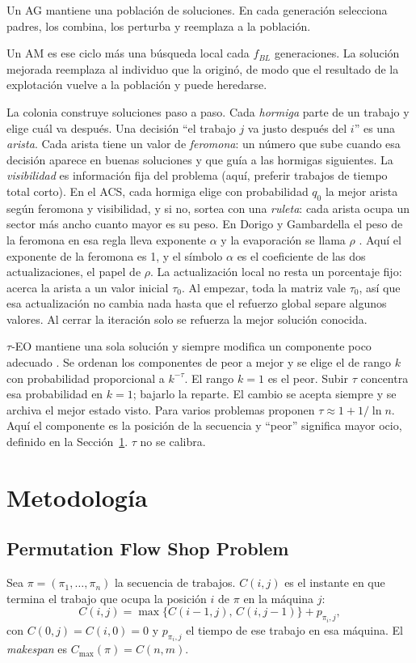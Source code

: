 \documentclass[journal]{IEEEtran}
\begin{document}
Un AG mantiene una población de soluciones. En cada generación selecciona padres, los combina, los perturba y reemplaza a la población.

Un AM es ese ciclo más una búsqueda local cada $f_{BL}$ generaciones. La solución mejorada reemplaza al individuo que la originó, de modo que el resultado de la explotación vuelve a la población y puede heredarse.

La colonia construye soluciones paso a paso. Cada \emph{hormiga} parte de un trabajo y elige cuál va después. Una decisión ``el trabajo $j$ va justo después del $i$'' es una \emph{arista}. Cada arista tiene un valor de \emph{feromona}: un número que sube cuando esa decisión aparece en buenas soluciones y que guía a las hormigas siguientes. La \emph{visibilidad} es información fija del problema (aquí, preferir trabajos de tiempo total corto). En el ACS, cada hormiga elige con probabilidad $q_0$ la mejor arista según feromona y visibilidad, y si no, sortea con una \emph{ruleta}: cada arista ocupa un sector más ancho cuanto mayor es su peso. En Dorigo y Gambardella el peso de la feromona en esa regla lleva exponente $\alpha$ y la evaporación se llama $\rho$ \cite{dorigo_ant_1997}. Aquí el exponente de la feromona es 1, y el símbolo $\alpha$ es el coeficiente de las dos actualizaciones, el papel de $\rho$. La actualización local no resta un porcentaje fijo: acerca la arista a un valor inicial $\tau_0$. Al empezar, toda la matriz vale $\tau_0$, así que esa actualización no cambia nada hasta que el refuerzo global separe algunos valores. Al cerrar la iteración solo se refuerza la mejor solución conocida.

$\tau$-EO mantiene una sola solución y siempre modifica un componente poco adecuado \cite{boettcher_natures_2000,boettcher_optimization_2001}. Se ordenan los componentes de peor a mejor y se elige el de rango $k$ con probabilidad proporcional a $k^{-\tau}$. El rango $k=1$ es el peor. Subir $\tau$ concentra esa probabilidad en $k=1$; bajarlo la reparte. El cambio se acepta siempre y se archiva el mejor estado visto. Para varios problemas proponen $\tau\approx 1+1/\ln n$. Aquí el componente es la posición de la secuencia y ``peor'' significa mayor ocio, definido en la Sección~\ref{sec:metodo}. $\tau$ no se calibra.

\section{Metodología}\label{sec:metodo}
\subsection{Permutation Flow Shop Problem}
Sea $\pi=(\pi_1,\ldots,\pi_n)$ la secuencia de trabajos. $C(i,j)$ es el instante en que termina el trabajo que ocupa la posición $i$ de $\pi$ en la máquina $j$:
\begin{equation}
  C(i,j)=\max\{C(i-1,j),\,C(i,j-1)\}+p_{\pi_i,j},\label{eq:cmax}
\end{equation}
con $C(0,j)=C(i,0)=0$ y $p_{\pi_i,j}$ el tiempo de ese trabajo en esa máquina. El \textit{makespan} es $C_{\max}(\pi)=C(n,m)$.
\end{document}
